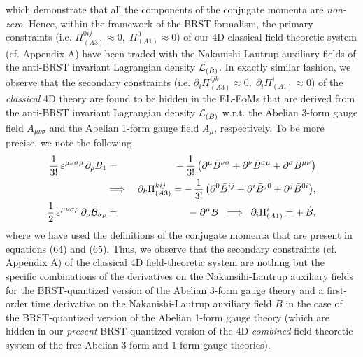 \documentclass[12pt]{article}
\begin{document}
which demonstrate that all the components of the conjugate momenta are {\it non-zero}. Hence, within the framework of the BRST formalism, the primary
constraints (i.e. $\Pi^{0ij}_{(A3)} \approx 0, \;  \Pi^{0}_{(A1)}  \approx 0$) of our 4D classical 
field-theoretic system (cf. Appendix A) have been traded with the Nakanishi-Lautrup auxiliary fields of the anti-BRST invariant 
Lagrangian density ${\cal L}_{(\bar B)}$. In exactly similar fashion, we observe that the secondary constraints 
(i.e. $\partial_i \Pi ^{ijk}_{(A3)} \approx 0,\; \partial_i \Pi ^{i}_{(A1)} \approx 0$) of the {\it classical} 4D theory are found to be hidden in the
EL-EoMs that are derived from the anti-BRST invariant Lagrangian density ${\cal L}_{(\bar B)}$ w.r.t. the Abelian 3-form gauge
field $A_{\mu\nu\sigma}$ and the Abelian 1-form gauge field $A_\mu$, respectively. To be more precise,  we note the following
\begin{eqnarray}\label{66}
 \dfrac{1}{3!}\, \varepsilon^{\mu\nu\sigma\rho}\,\partial_\rho B_1 &=& -\, \dfrac{1}{3!}\, 
\big (\partial^\mu \bar B^{\nu\sigma} + \partial^\nu \bar B^{\sigma\mu} 
 + \partial^\sigma \bar B^{\mu\nu} \big ) \nonumber\\
&\Longrightarrow& \;\partial_k \Pi^{kij}_{(A3)} = -\, \dfrac{1}{3!}\, 
\big (\partial^0 \bar B^{ij} + \partial^i \bar B^{j0}  + \partial^j \bar B^{0i} \big ), \nonumber\\
\dfrac{1}{2}\, \varepsilon^{\mu\nu\sigma\rho}\,\partial_\nu \bar {\cal B}_{\sigma\rho} &=& -\; \partial^\mu B \;\;\Longrightarrow \;\; 
\partial_i \Pi^i_{(A1)} = +\, \dot B,
\end{eqnarray}
where we have used the definitions of the conjugate momenta that are present in equations (64) and (65).
Thus, we observe that the secondary constraints (cf. Appendix A) of the classical 4D field-theoretic system are nothing but the specific combinations of the
derivatives on the Nakansihi-Lautrup auxiliary fields for the BRST-quantized version of the Abelian 3-form gauge theory and a first-order
time derivative on the Nakanishi-Lautrup auxiliary field $B$ in the case of the BRST-quantized version of the Abelian 1-form gauge theory (which
are hidden in our {\it present} BRST-quantized version of the 4D {\it combined} field-theoretic system of the
free Abelian 3-form and 1-form gauge theories).
\end{document}
